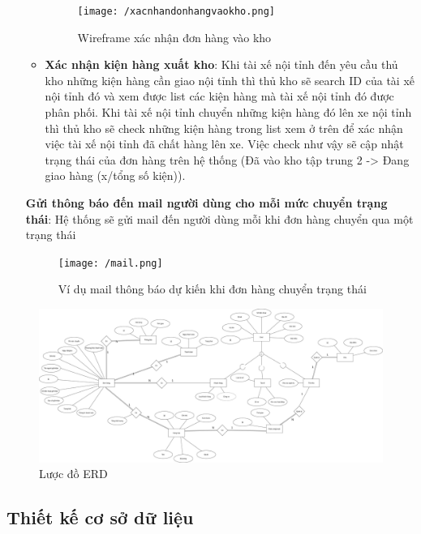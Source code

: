 \begin{itemize}
\begin{itemize}
		\newpage
		
		\begin{figure}[!ht]
			\texttt{[image: /xacnhandonhangvaokho.png]}
			\centering
			\linebreak
			\caption{Wireframe xác nhận đơn hàng vào kho}
		\end{figure}
		
		\item \textbf{Xác nhận kiện hàng xuất kho}: Khi tài xế nội tỉnh đến yêu cầu thủ kho những kiện hàng cần giao nội tỉnh thì thủ kho sẽ search ID của tài xế nội tỉnh đó và xem được list các kiện hàng mà tài xế nội tỉnh đó được phân phối. Khi tài xế nội tỉnh chuyển những kiện hàng đó lên xe nội tỉnh thì thủ kho sẽ check những kiện hàng trong list xem ở trên để xác nhận việc tài xế nội tỉnh đã chất hàng lên xe. Việc check như vậy sẽ cập nhật trạng thái của đơn hàng trên hệ thống (Đã vào kho tập trung 2 -> Đang giao hàng (x/tổng số kiện)).
	\end{itemize}
	\textbf{Gửi thông báo đến mail người dùng cho mỗi mức chuyển trạng thái}: Hệ thống sẽ gửi mail đến người dùng mỗi khi đơn hàng chuyển qua một trạng thái
	
	\begin{figure}[!ht]
		\texttt{[image: /mail.png]}
		\centering
		\linebreak
		\caption{Ví dụ mail thông báo dự kiến khi đơn hàng chuyển trạng thái}
	\end{figure}
	
\end{itemize}



    \begin{figure}[!ht]
		\includegraphics[width=1\textwidth]{Images/erd.jpg}
		\centering
		\linebreak
		\caption{Lược đồ ERD}
	\end{figure}
	
	
	
	
	\subsection{Thiết kế cơ sở dữ liệu}



	